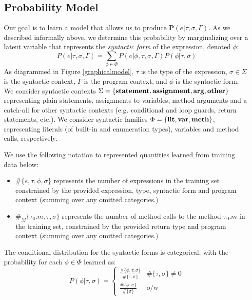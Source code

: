 \documentclass{article} %
\begin{document}
\newcommand{\nm}[1]{\#\{#1\}}
\newcommand{\nmm}[1]{\#_M\{#1\}}

\subsection*{Probability Model}
      Our goal is to learn a model that allows us to produce $\mathbf{P}(e|\tau, \sigma, \Gamma)$. As we described informally above, we determine this probability by marginalizing over a latent variable that represents the \emph{syntactic form} of the expression, denoted $\phi$:
    $$P(e | \tau, \sigma, \Gamma) = \sum_{\phi \in \Phi} P(e | \phi, \tau, \sigma, \Gamma) P(\phi | \tau, \sigma)$$
As diagrammed in Figure \ref{graphicalmodel}, $\tau$ is the type of the expression, $\sigma \in \Sigma$ is the syntactic context, $\Gamma$ is the program context, and $\phi$ is the syntactic form. We consider syntactic contexts $\Sigma = \{\textbf{statement}, \textbf{assignment}, \textbf{arg}, \textbf{other}\}$ representing plain statements, assignments to variables, method arguments and a catch-all for other syntactic contexts (e.g. conditional and loop guards, return statements, etc.). We consider syntactic families $\Phi = \{\textbf{lit}, \textbf{var}, \textbf{meth}\}$, representing literals (of built-in and enumeration types), variables and method calls, respectively. 

	  We use the following notation to represented quantities learned from training data below:
	  \begin{itemize}
	  \item $\nm{e, \tau, \phi, \sigma}$ represents the number of expressions in the training set constrained by the provided expression, type, syntactic form and program context (summing over any omitted categories.)
	  \item $\nmm{\tau_0.m, \tau, \sigma}$ represents the number of method calls to the method $\tau_0.m$ in the training set, constrained by the provided return type and program context (summing over any omitted categories.)
  	  \end{itemize}
  
  The conditional distribution for the syntactic forms is categorical, with the probability for each $\phi \in \Phi$ learned as:
  $$P(\phi | \tau, \sigma) = 
  \left\{
  	\begin{array}{ll}
	 	\frac{\nm{\phi,\tau, \sigma}}{\nm{\tau, \sigma}} & \nm{\tau, \sigma} \neq 0\\
		\frac{\nm{\phi, \sigma}}{\nm{\sigma}} & \mbox{o/w}
	\end{array}
	\right.
  $$
  
\end{document}
